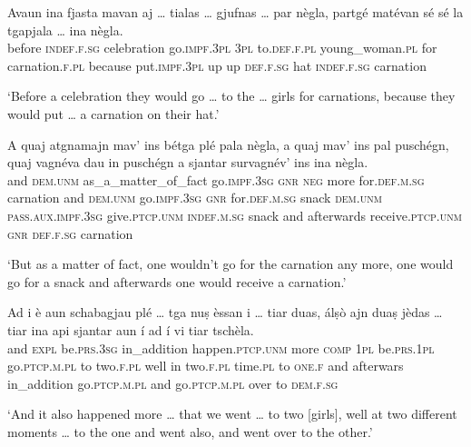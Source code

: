 \begin{linenumbers}
	\gll    Avaun ina fjasta mavan aj … tialas … gjufnas … par nègla, partgé matévan sé sé la tgapjala … ina nègla.\\
	before \textsc{indef.f.sg} celebration go.\textsc{impf.3pl} \textsc{3pl} {} to.\textsc{def.f.pl} {}  young\_woman.\textsc{pl} {} for carnation.\textsc{f.pl} because put.\textsc{impf.3pl} up up  \textsc{def.f.sg} hat {} \textsc{indef.f.sg} carnation \\
\end{linenumbers}
\medskip
\glt `Before a celebration they would go … to the … girls for carnations, because they would put … a carnation on their hat.'
\medskip

\begin{linenumbers}
	\gll    A quaj atgnamajn mav’ ins bétga plé pala nègla, a quaj mav’ ins pal puschégn, quaj vagnéva dau in puschégn a sjantar survagnév’ ins ina nègla.\\
	and  \textsc{dem.unm} as\_a\_matter\_of\_fact  go.\textsc{impf.3sg} \textsc{gnr} \textsc{neg} more for.\textsc{def.m.sg} carnation and \textsc{dem.unm} go.\textsc{impf.3sg} \textsc{gnr} for.\textsc{def.m.sg} snack \textsc{dem.unm} \textsc{pass.aux.impf.3sg} give.\textsc{ptcp.unm} \textsc{indef.m.sg} snack and afterwards receive.\textsc{ptcp.unm} \textsc{gnr} \textsc{def.f.sg} carnation\\
\end{linenumbers}
\medskip
\glt `But as a matter of fact, one wouldn’t go for the carnation any more, one would go for a snack and afterwards one would receive a carnation.'
\medskip

\begin{linenumbers}
	\gll    Ad i è aun schabagjau plé … tga nuṣ èssan i … tiar duas, álṣò ajn duaṣ jèdas … tiar ina api sjantar aun í ad í vi tiar tschèla.\\
	and \textsc{expl} be.\textsc{prs.3sg} in\_addition happen.\textsc{ptcp.unm} more {} \textsc{comp}  \textsc{1pl} be.\textsc{prs.1pl} go.\textsc{ptcp.m.pl} {} to two.\textsc{f.pl} well in two.\textsc{f.pl} time.\textsc{pl} {} to \textsc{one.f} and afterwars in\_addition go.\textsc{ptcp.m.pl} and  go.\textsc{ptcp.m.pl} over to \textsc{dem.f.sg}\\
\end{linenumbers}
\medskip
\glt `And it also happened more … that we went … to two [girls], well at two different moments … to the one and went also, and went over to the other.'
\medskip

